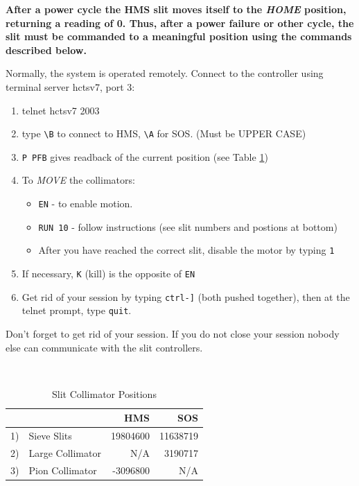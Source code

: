 {\bf After a power cycle the HMS slit moves itself to the {\it HOME} position,
returning a reading of 0. Thus, after a power failure or other cycle, the slit
must be commanded to a meaningful position using the commands described below.}

Normally, the system is operated remotely. Connect to the controller
using terminal server hctsv7, port 3:

\begin{minipage}{6in}
\begin{enumerate}
\item telnet hctsv7 2003
\item type {\tt \verb|\B|} to connect to HMS, {\tt \verb|\A|} for SOS. (Must be UPPER CASE)
\item {\tt P PFB} gives readback of the current position (see Table \ref{tab:col_pos})
\item To {\em MOVE} the collimators:
   \begin{itemize}
	\item {\tt EN} - to enable motion.
	\item {\tt RUN 10} - follow instructions (see slit numbers and postions at bottom)
	\item After you have reached the correct slit, disable the motor by typing {\tt 1}

   \end{itemize}
\item If necessary, {\tt K} (kill) is the opposite of {\tt EN}
\item Get rid of your session by typing {\tt \verb|ctrl-]|} (both pushed together), then
at the telnet prompt, type {\tt quit}.
\end{enumerate}
\end{minipage}

Don't forget to get rid of your session. If you do not close your session nobody
else can communicate with the slit controllers.

\begin{table}[!ht]\
\caption{Slit Collimator Positions\label{tab:col_pos}}
\begin{center}
\begin{tabular}{rlrr}
   &                  &     HMS   & SOS\\
\hline
1) & Sieve Slits      &  19804600 &  11638719\\
2) & Large Collimator &       N/A &   3190717\\
3) & Pion Collimator  &  -3096800 &       N/A\\
\end{tabular}
\end{center}
\end{table}
   
